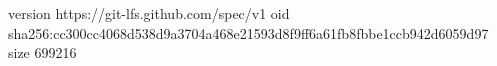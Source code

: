 version https://git-lfs.github.com/spec/v1
oid sha256:cc300cc4068d538d9a3704a468e21593d8f9ff6a61fb8fbbe1ccb942d6059d97
size 699216
